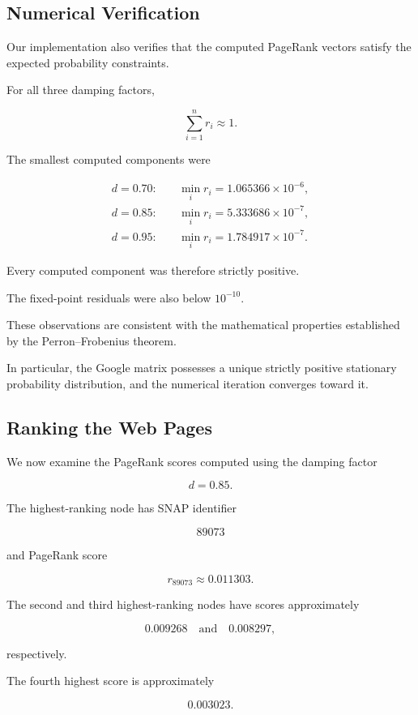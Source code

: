 \documentclass[11pt,a4paper]{article}
\theoremstyle{definition}
\theoremstyle{remark}
\begin{document}
\subsection{Numerical Verification}

Our implementation also verifies
that the computed PageRank
vectors satisfy the expected
probability constraints.

For all three damping factors,

\[
\sum_{i=1}^{n}r_i\approx1.
\]

The smallest computed
components were

\[
\begin{aligned}
d=0.70:\quad&
\min_i r_i
=1.065366\times10^{-6},\\
d=0.85:\quad&
\min_i r_i
=5.333686\times10^{-7},\\
d=0.95:\quad&
\min_i r_i
=1.784917\times10^{-7}.
\end{aligned}
\]

Every computed component
was therefore strictly positive.

The fixed-point residuals
were also below $10^{-10}$.

These observations are
consistent with the
mathematical properties
established by the
Perron--Frobenius theorem.

In particular, the Google
matrix possesses a unique
strictly positive stationary
probability distribution,
and the numerical iteration
converges toward it.

\subsection{Ranking the Web Pages}

We now examine the
PageRank scores computed
using the damping factor

\[
d=0.85.
\]

The highest-ranking node
has SNAP identifier

\[
89073
\]

and PageRank score

\[
r_{89073}\approx0.011303.
\]

The second and third
highest-ranking nodes have
scores approximately

\[
0.009268
\quad\text{and}\quad
0.008297,
\]

respectively.

The fourth highest score
is approximately

\[
0.003023.
\]
\end{document}
